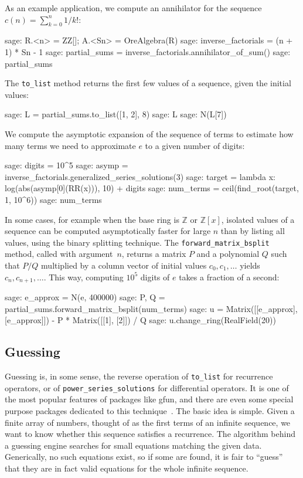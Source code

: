 \documentclass{llncs}
\begin{document}
As an example application, we compute an annihilator for the sequence
$c(n) = \sum_{k=0}^n 1 / k!$:

\begin{sageexample}
  sage: R.<n> = ZZ[]; A.<Sn> = OreAlgebra(R)
  sage: inverse_factorials = (n + 1) * Sn - 1
  sage: partial_sums = inverse_factorials.annihilator_of_sum()
  sage: partial_sums
\end{sageexample}

The \verb|to_list| method returns the first few values of a sequence,
given the initial values:

\begin{sageexample}
  sage: L = partial_sums.to_list([1, 2], 8)
  sage: L
  sage: N(L[7])
\end{sageexample}

We compute the asymptotic expansion of the sequence of terms
to estimate how many terms we need to approximate $e$ to a given
number of digits:

\begin{sageexample}
  sage: digits = 10^5
  sage: asymp = inverse_factorials.generalized_series_solutions(3)
  sage: target = lambda x: log(abs(asymp[0](RR(x))), 10) + digits
  sage: num_terms = ceil(find_root(target, 1, 10^6))
  sage: num_terms
\end{sageexample}

In some cases, for example when the base ring is $\mathbb{Z}$ or
$\mathbb{Z}[x]$, isolated values of a sequence can be
computed asymptotically faster for large $n$ than by listing all
values, using the binary splitting technique.
The \verb|forward_matrix_bsplit| method, called with argument~$n$,
returns a matrix $P$ and a polynomial $Q$ such that $P / Q$ multiplied by a
column vector of initial values $c_0, c_1, \ldots$
yields $c_n, c_{n+1}, \ldots$.
This way, computing $10^5$ digits of $e$ takes a fraction of a second:

\begin{sageexample}
  sage: e_approx = N(e, 400000)
  sage: P, Q = partial_sums.forward_matrix_bsplit(num_terms)
  sage: u = Matrix([[e_approx], [e_approx]]) - P * Matrix([[1], [2]]) / Q
  sage: u.change_ring(RealField(20))
\end{sageexample}

\subsection{Guessing}

Guessing is, in some sense, the reverse operation of \verb|to_list| for
recurrence operators, or of \verb|power_series_solutions| for differential
operators.  It is one of the most popular features of packages like gfun, and there
are even some special purpose packages dedicated to this
technique~\cite{kauers09a,hebisch11}. The basic idea is simple. Given
a finite array of numbers, thought of as the first terms of an infinite
sequence, we want to know whether this sequence satisfies a recurrence. The
algorithm behind a guessing engine searches for small equations matching the
given data.  Generically, no such equations exist, so if some are found, it is
fair to ``guess'' that they are in fact valid equations for the whole infinite
sequence.
\end{document}
